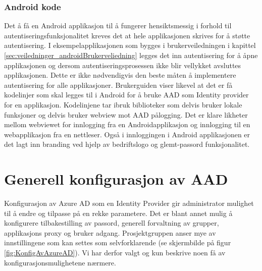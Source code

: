 \subsubsection{Android kode}
Det å få en Android applikasjon til å fungerer hensiktsmessig i forhold til autentiseringsfunksjonalitet kreves det at hele applikasjonen skrives for å støtte autentisering. I eksempelapplikasjonen som bygges i brukerveiledningen i kapittel \ref{sec:veiledninger_androidBrukerveliedning} legges det inn autentisering for å åpne applikasjonen og dersom autentiseringsprosessen ikke blir vellykket avsluttes applikasjonen. Dette er ikke nødvendigvis den beste måten å implementere autentisering for alle applikasjoner. Brukerguiden viser likevel at det er få kodelinjer som skal legges til i Android for å bruke AAD som Identity provider for en applikasjon. Kodelinjene tar ibruk biblioteker som delvis bruker lokale funksjoner og delvis bruker webview mot AAD pålogging. Det er klare likheter mellom webviewet for innlogging fra en Androidapplikasjon og innlogging til en webapplikasjon fra en nettleser. Også i innloggingen i Android applikasjonen er det lagt inn branding ved hjelp av bedriftslogo og glemt-passord funksjonalitet.

\section{Generell konfigurasjon av AAD}
\label{sec:konfigurasjon_genrellHaandteringAvAad}
Konfigurasjon av Azure AD som en Identity Provider gir administrator mulighet til å endre og tilpasse på en rekke parametere. Det er blant annet mulig å konfigurere tilbakestilling av passord, generell forvaltning av grupper, applikasjons proxy og bruker adgang. Prosjektgruppen anser mye av innstillingene som kan settes som selvforklarende (se skjermbilde på figur \ref{fig:KonfigAvAzureAD}). Vi har derfor valgt og kun beskrive noen få av konfigurasjonsmulighetene nærmere.  

